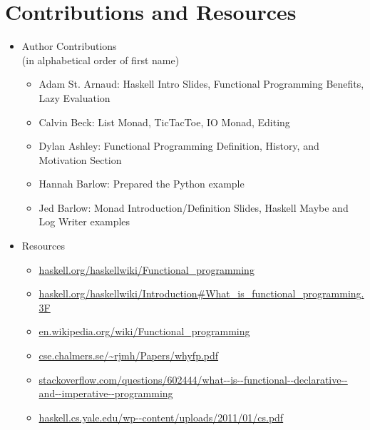 \documentclass[]{beamer}
\begin{document}
\begin{frame}
\maketitle
\end{frame}





\section{Contributions and Resources}
\begin{frame}[fragile]
    \begin{itemize}
        \item Author Contributions\\{\scriptsize(in alphabetical order of first name)}
            \begin{itemize}
                \item Adam St. Arnaud:
                    Haskell Intro Slides, Functional Programming Benefits, Lazy Evaluation
                \item Calvin Beck:
                    List Monad, TicTacToe, IO Monad, Editing
                \item Dylan Ashley:
                    Functional Programming Definition, History, and Motivation Section
                \item Hannah Barlow:
                    Prepared the Python example
                \item Jed Barlow:
                    Monad Introduction/Definition Slides, Haskell Maybe and Log Writer examples
            \end{itemize}
        \item Resources
            \begin{itemize}
                \item \url{haskell.org/haskellwiki/Functional_programming}
                \item \url{haskell.org/haskellwiki/Introduction#What_is_functional_programming.3F}
                \item \url{en.wikipedia.org/wiki/Functional_programming}
                \item \url{cse.chalmers.se/~rjmh/Papers/whyfp.pdf}
                \item \url{stackoverflow.com/questions/602444/what--is--functional--declarative--and--imperative--programming}
                \item \url{haskell.cs.yale.edu/wp--content/uploads/2011/01/cs.pdf}
            \end{itemize}
    \end{itemize}
\end{frame}
\end{document}
